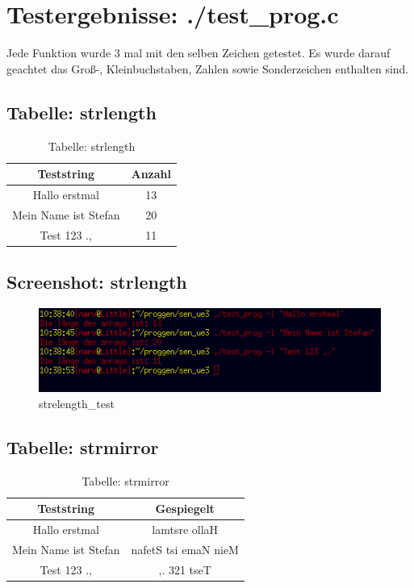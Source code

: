 \documentclass{scrartcl}
\begin{document}
\section{Testergebnisse: ./test\_prog.c}
Jede Funktion wurde 3 mal mit den selben Zeichen getestet. Es wurde darauf geachtet das Groß-, Kleinbuchstaben, Zahlen sowie Sonderzeichen enthalten sind.

\subsection{Tabelle: strlength}
\begin{table}[H]
  \centering
  \begin{tabular}{|c|c|}
    \hline
    Teststring & Anzahl \\
    \hline
    Hallo erstmal & 13 \\
    \hline
    Mein Name ist Stefan & 20 \\
    \hline
    Test 123 ., & 11 \\
    \hline
  \end{tabular}
  \caption{Tabelle: strlength}
\end{table}
\subsection{Screenshot: strlength}
\begin{figure}[H]
  \centering
  \includegraphics[width=0.9\linewidth]{images/strlength_test.png}
  \caption{strelength\_test}
  \label{fig:digraph}
\end{figure}

\newpage
\subsection{Tabelle: strmirror}
\begin{table}[H]
  \centering
  \begin{tabular}{|c|c|}
    \hline
    Teststring & Gespiegelt \\
    \hline
    Hallo erstmal & lamtsre ollaH \\
    \hline
    Mein Name ist Stefan & nafetS tsi emaN nieM \\
    \hline
    Test 123 ., & ,. 321 tseT \\
    \hline
  \end{tabular}
  \caption{Tabelle: strmirror}
\end{table}
\end{document}
